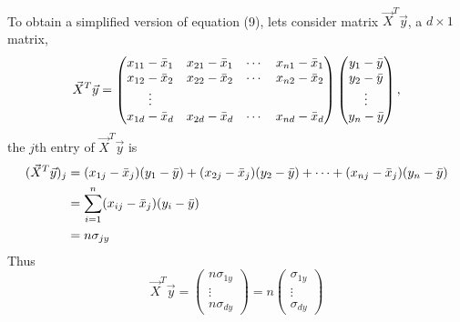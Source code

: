 \documentclass{article}
\begin{document}
\paragraph{}
To obtain a simplified version of equation (9), lets consider matrix $\Vec{X}^T \Vec{y}$, a $d \times 1$ matrix,
\begin{equation*}
    \Vec{X}^T \Vec{y} = 
    \begin{pmatrix}
    x_{11} - \Bar{x}_1 & x_{21} - \Bar{x}_1 & \cdots & x_{n1} - \Bar{x}_1 \\
    x_{12} - \Bar{x}_2 & x_{22} - \Bar{x}_2 & \cdots & x_{n2} - \Bar{x}_2 \\
    \vdots \\
    x_{1d} - \Bar{x}_d & x_{2d} - \Bar{x}_d & \cdots & x_{nd} - \Bar{x}_d 
    \end{pmatrix}
    \begin{pmatrix}
    y_1 - \Bar{y} \\
    y_2 - \Bar{y} \\
    \vdots \\
    y_n - \Bar{y}
    \end{pmatrix},
\end{equation*}
the $j$th entry of $\Vec{X}^T \Vec{y}$ is 
\begin{align*}
    (\Vec{X}^T\Vec{y})_j &= (x_{1j}-\Bar{x}_{j})(y_1 - \Bar{y}) +
    (x_{2j}-\Bar{x}_{j})(y_2 - \Bar{y}) + 
    \cdots +
    (x_{nj}-\Bar{x}_{j})(y_n - \Bar{y}) \\
    &= \displaystyle\sum_{i=1}^{n} (x_{ij}-\Bar{x}_{j})(y_i - \Bar{y}) \\
    &= n \sigma_{jy}
\end{align*} 
Thus 
\begin{equation}
    \Vec{X}^T \Vec{y} =
    \begin{pmatrix}
    n \sigma_{1y} \\
    \vdots \\
    n \sigma_{dy}
    \end{pmatrix}
    =
    n \begin{pmatrix}
    \sigma_{1y} \\
    \vdots \\
    \sigma_{dy}
    \end{pmatrix}
\end{equation}
\end{document}
